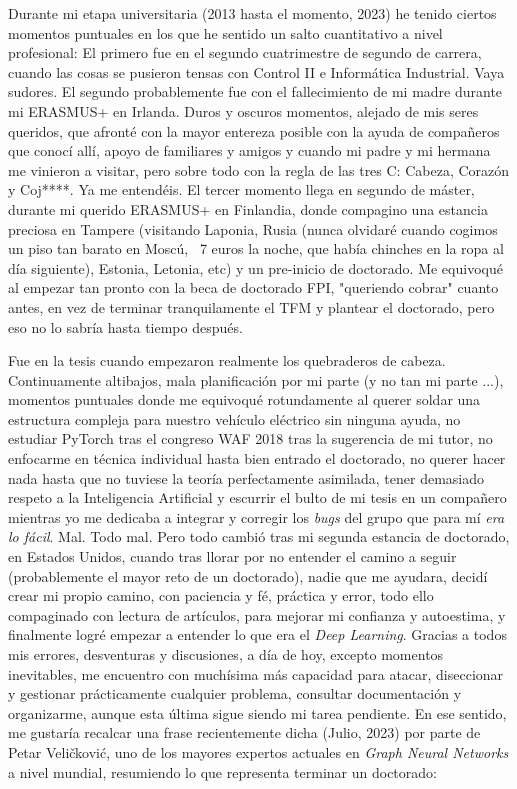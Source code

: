 Durante mi etapa universitaria (2013 hasta el momento, 2023) he tenido ciertos momentos puntuales en los que he sentido un salto cuantitativo a nivel profesional: El primero fue en el segundo cuatrimestre de segundo de carrera, cuando las cosas se pusieron tensas con Control II e Informática Industrial. Vaya sudores. El segundo probablemente fue con el fallecimiento de mi madre durante mi ERASMUS+ en Irlanda. Duros y oscuros momentos, alejado de mis seres queridos, que afronté con la mayor entereza posible con la ayuda de compañeros que conocí allí, apoyo de familiares y amigos y cuando mi padre y mi hermana me vinieron a visitar, pero sobre todo con la regla de las tres C: Cabeza, Corazón y Coj****. Ya me entendéis. El tercer momento llega en segundo de máster, durante mi querido ERASMUS+ en Finlandia, donde compagino una estancia preciosa en Tampere (visitando Laponia, Rusia (nunca olvidaré cuando cogimos un piso tan barato en Moscú, \ie \ 7 euros la noche, que había chinches en la ropa al día siguiente), Estonia, Letonia, etc) y un pre-inicio de doctorado. Me equivoqué al empezar tan pronto con la beca de doctorado FPI, "queriendo cobrar" cuanto antes, en vez de terminar tranquilamente el TFM y plantear el doctorado, pero eso no lo sabría hasta tiempo después. 

Fue en la tesis cuando empezaron realmente los quebraderos de cabeza. Continuamente altibajos, mala planificación por mi parte (y no tan mi parte ...), momentos puntuales donde me equivoqué rotundamente al querer soldar una estructura compleja para nuestro vehículo eléctrico sin ninguna ayuda, no estudiar PyTorch tras el congreso WAF 2018 tras la sugerencia de mi tutor, no enfocarme en técnica individual hasta bien entrado el doctorado, no querer hacer nada hasta que no tuviese la teoría perfectamente asimilada, tener demasiado respeto a la Inteligencia Artificial y escurrir el bulto de mi tesis en un compañero mientras yo me dedicaba a integrar y corregir los \textit{bugs} del grupo que para mí \textit{era lo fácil}. Mal. Todo mal. Pero todo cambió tras mi segunda estancia de doctorado, en Estados Unidos, cuando tras llorar por no entender el camino a seguir (probablemente el mayor reto de un doctorado), nadie que me ayudara, decidí crear mi propio camino, con paciencia y fé, práctica y error, todo ello compaginado con lectura de artículos, para mejorar mi confianza y autoestima, y finalmente logré empezar a entender lo que era el \textit{Deep Learning}. Gracias a todos mis errores, desventuras y discusiones, a día de hoy, excepto momentos inevitables, me encuentro con muchísima más capacidad para atacar, diseccionar y gestionar prácticamente cualquier problema, consultar documentación y organizarme, aunque esta última sigue siendo mi tarea pendiente. En ese sentido, me gustaría recalcar una frase recientemente dicha (Julio, 2023) por parte de Petar Veličković, uno de los mayores expertos actuales en \textit{Graph Neural Networks} a nivel mundial, resumiendo lo que representa terminar un doctorado:

